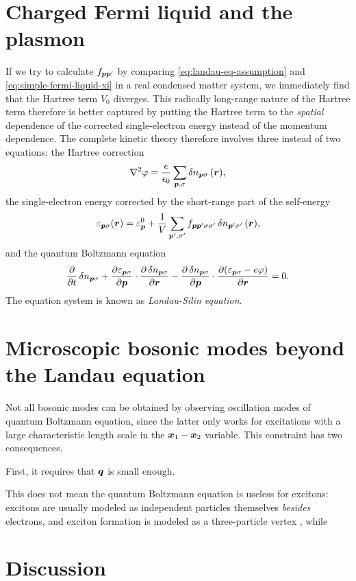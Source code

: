 \documentclass[hyperref, a4paper]{article}
\begin{document}
\section{Charged Fermi liquid and the plasmon}\label{sec:charged-fermi-liquid}

If we try to calculate $f_{\vb*{p} \vb*{p}'}$ by 
comparing \eqref{eq:landau-eq-assumption} and \eqref{eq:simple-fermi-liquid-xi}
in a real condensed matter system,
we immediately find that the Hartree term $V_0$ diverges.
This radically long-range nature of the Hartree term therefore 
is better captured by 
putting the Hartree term to the 
\emph{spatial} dependence of the corrected single-electron energy 
instead of the momentum dependence.
The complete kinetic theory therefore involves three instead of two equations:
the Hartree correction
\begin{equation}
    \laplacian \varphi = \frac{e}{\epsilon_0} \sum_{\vb*{p}, \sigma} \var{n}_{\vb*{p} \sigma}(\vb*{r}),
\end{equation}
the single-electron energy corrected by 
the short-range part of the self-energy
\begin{equation}
    \varepsilon_{\vb*{p} \sigma}(\vb*{r}) = \varepsilon^0_{\vb*{p}} 
        + \frac{1}{V} \sum_{\vb*{p}', \sigma'} 
        f_{\vb*{p} \vb*{p}' \sigma \sigma'} \var{n}_{\vb*{p}' \sigma'}(\vb*{r}),
\end{equation}
and the quantum Boltzmann equation 
\begin{equation}
    \pdv{t} \var{n}_{\vb*{p} \sigma} 
    + \pdv{\varepsilon_{\vb*{p} \sigma}}{\vb*{p}} \cdot \pdv{\var{n}_{\vb*{p} \sigma}}{\vb*{r}}
    - \pdv{\var{n}_{\vb*{p} \sigma}}{\vb*{p}} \cdot \pdv{(\varepsilon_{\vb*{p} \sigma} - e \varphi)}{\vb*{r}} = 0.
\end{equation}
The equation system is known as \emph{Landau-Silin equation}.

\section{Microscopic bosonic modes beyond the Landau equation}\label{sec:microscopic-bosonic-modes}

Not all bosonic modes can be obtained 
by observing oscillation modes of quantum Boltzmann equation,
since the latter only works for 
excitations with a large characteristic length scale 
in the $\vb*{x}_1 - \vb*{x}_2$ variable.
This constraint has two consequences.

First, it requires that $\vb*{q}$ is small enough.


This does not mean the quantum Boltzmann equation is useless for excitons:
excitons are usually modeled as independent particles themselves
\emph{besides} electrons,
and exciton formation is modeled as 
a three-particle vertex \cite{klimontovich1981quantum},
while 


\section{Discussion}

\printbibliography
\end{document}
